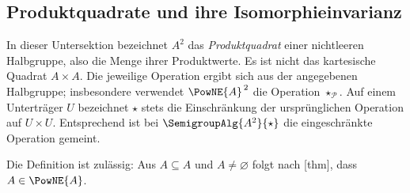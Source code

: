 \documentclass[main.tex]{subfiles}
\begin{document}


\subsection{Produktquadrate und ihre Isomorphieinvarianz}

\par\noindent\begin{minipage}{\linewidth}
\end{minipage}\par
\begin{tabproofwide}
\end{tabproofwide}

In dieser Untersektion bezeichnet \(A^2\) das \emph{Produktquadrat}
einer nichtleeren Halbgruppe, also die Menge ihrer Produktwerte.  Es ist
nicht das kartesische Quadrat \(A\times A\).  Die jeweilige Operation
ergibt sich aus der angegebenen Halbgruppe; insbesondere verwendet
\(\PowNE{A}^{\,2}\) die Operation \(\star_{\mathcal P}\).
Auf einem Unterträger \(U\) bezeichnet \(\star\) stets die Einschränkung
der ursprünglichen Operation auf \(U\times U\). Entsprechend ist bei
\(\SemigroupAlg{A^2}{\star}\) die eingeschränkte Operation gemeint.

\par\noindent\begin{minipage}{\linewidth}
\end{minipage}\par
Die Definition ist zulässig: Aus \(A\subseteq A\) und
\(A\neq\varnothing\) folgt nach
[thm], dass
\(A\in\PowNE{A}\).
\end{document}
